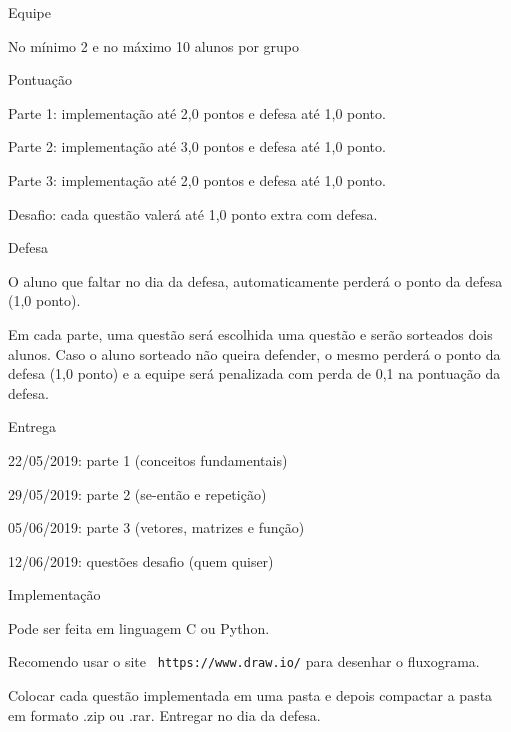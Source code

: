 \begin{DoxyEnumerate}
\item Equipe
\begin{DoxyItemize}
\item No mínimo 2 e no máximo 10 alunos por grupo
\end{DoxyItemize}
\item Pontuação
\begin{DoxyItemize}
\item Parte 1\+: implementação até 2,0 pontos e defesa até 1,0 ponto.
\item Parte 2\+: implementação até 3,0 pontos e defesa até 1,0 ponto.
\item Parte 3\+: implementação até 2,0 pontos e defesa até 1,0 ponto.
\item Desafio\+: cada questão valerá até 1,0 ponto extra com defesa.
\end{DoxyItemize}
\item Defesa
\begin{DoxyItemize}
\item O aluno que faltar no dia da defesa, automaticamente perderá o ponto da defesa (1,0 ponto).
\item Em cada parte, uma questão será escolhida uma questão e serão sorteados dois alunos. Caso o aluno sorteado não queira defender, o mesmo perderá o ponto da defesa (1,0 ponto) e a equipe será penalizada com perda de 0,1 na pontuação da defesa.
\end{DoxyItemize}
\item Entrega
\begin{DoxyItemize}
\item 22/05/2019\+: parte 1 (conceitos fundamentais)
\item 29/05/2019\+: parte 2 (se-\/então e repetição)
\item 05/06/2019\+: parte 3 (vetores, matrizes e função)
\item 12/06/2019\+: questões desafio (quem quiser)
\end{DoxyItemize}
\item Implementação
\begin{DoxyItemize}
\item Pode ser feita em linguagem C ou Python.
\item Recomendo usar o site {\texttt{ https\+://www.\+draw.\+io/}} para desenhar o fluxograma.
\item Colocar cada questão implementada em uma pasta e depois compactar a pasta em formato .zip ou .rar. Entregar no dia da defesa. 
\end{DoxyItemize}
\end{DoxyEnumerate}